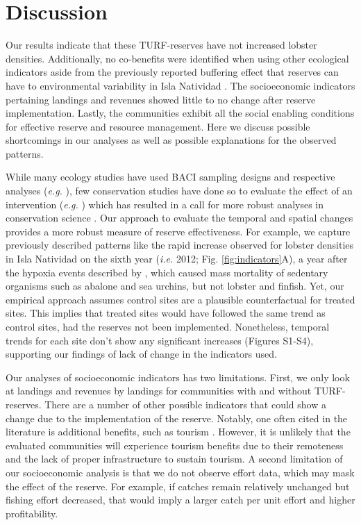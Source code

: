 \documentclass{frontiersSCNS}
\begin{document}
\hypertarget{discussion}{%
\section{Discussion}\label{discussion}}

Our results indicate that these TURF-reserves have not increased lobster
densities. Additionally, no co-benefits were identified when using other
ecological indicators aside from the previously reported buffering
effect that reserves can have to environmental variability in Isla
Natividad \citep{micheli_2012-EU}. The socioeconomic indicators
pertaining landings and revenues showed little to no change after
reserve implementation. Lastly, the communities exhibit all the social
enabling conditions for effective reserve and resource management. Here
we discuss possible shortcomings in our analyses as well as possible
explanations for the observed patterns.

While many ecology studies have used BACI sampling designs and
respective analyses (\emph{e.g.} \citet{stewartoaten_1986}), few
conservation studies have done so to evaluate the effect of an
intervention (\emph{e.g.}
\citet{francinifilho_2008,lester_2009,moland_2013}) which has resulted
in a call for more robust analyses in conservation science
\citep{guidetti_2002,ferraro_2006}. Our approach to evaluate the
temporal and spatial changes provides a more robust measure of reserve
effectiveness. For example, we capture previously described patterns
like the rapid increase observed for lobster densities in Isla Natividad
on the sixth year (\emph{i.e.} 2012; Fig. \ref{fig:indicators}A), a year
after the hypoxia events described by \citet{micheli_2012-EU}, which
caused mass mortality of sedentary organisms such as abalone and sea
urchins, but not lobster and finfish. Yet, our empirical approach
assumes control sites are a plausible counterfactual for treated sites.
This implies that treated sites would have followed the same trend as
control sites, had the reserves not been implemented. Nonetheless,
temporal trends for each site don't show any significant increases
(Figures S1-S4), supporting our findings of lack of change in the
indicators used.

Our analyses of socioeconomic indicators has two limitations. First, we
only look at landings and revenues by landings for communities with and
without TURF-reserves. There are a number of other possible indicators
that could show a change due to the implementation of the reserve.
Notably, one often cited in the literature is additional benefits, such
as tourism \citep{viana_2017}. However, it is unlikely that the
evaluated communities will experience tourism benefits due to their
remoteness and the lack of proper infrastructure to sustain tourism. A
second limitation of our socioeconomic analysis is that we do not
observe effort data, which may mask the effect of the reserve. For
example, if catches remain relatively unchanged but fishing effort
decreased, that would imply a larger catch per unit effort and higher
profitability.
\end{document}
